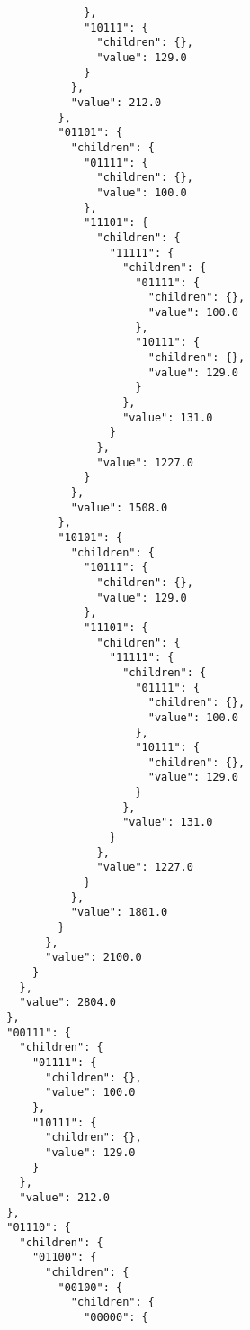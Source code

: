 \documentclass{article}
\begin{document}
\begin{listing}
\begin{verbatim}
                    },
                    "10111": {
                      "children": {},
                      "value": 129.0
                    }
                  },
                  "value": 212.0
                },
                "01101": {
                  "children": {
                    "01111": {
                      "children": {},
                      "value": 100.0
                    },
                    "11101": {
                      "children": {
                        "11111": {
                          "children": {
                            "01111": {
                              "children": {},
                              "value": 100.0
                            },
                            "10111": {
                              "children": {},
                              "value": 129.0
                            }
                          },
                          "value": 131.0
                        }
                      },
                      "value": 1227.0
                    }
                  },
                  "value": 1508.0
                },
                "10101": {
                  "children": {
                    "10111": {
                      "children": {},
                      "value": 129.0
                    },
                    "11101": {
                      "children": {
                        "11111": {
                          "children": {
                            "01111": {
                              "children": {},
                              "value": 100.0
                            },
                            "10111": {
                              "children": {},
                              "value": 129.0
                            }
                          },
                          "value": 131.0
                        }
                      },
                      "value": 1227.0
                    }
                  },
                  "value": 1801.0
                }
              },
              "value": 2100.0
            }
          },
          "value": 2804.0
        },
        "00111": {
          "children": {
            "01111": {
              "children": {},
              "value": 100.0
            },
            "10111": {
              "children": {},
              "value": 129.0
            }
          },
          "value": 212.0
        },
        "01110": {
          "children": {
            "01100": {
              "children": {
                "00100": {
                  "children": {
                    "00000": {

\end{verbatim}
\end{listing}
\end{document}
